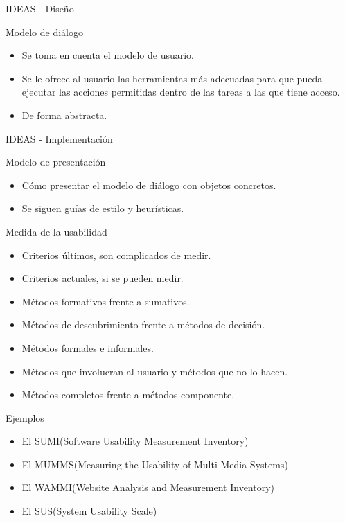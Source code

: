 \documentclass{beamer}
\begin{document}
\begin{frame}{IDEAS - Diseño}
  \begin{block}{Modelo de diálogo}
   \begin{itemize}
    \item Se toma en cuenta el modelo de usuario.
    \item Se le ofrece al usuario las herramientas más adecuadas para que pueda ejecutar las acciones permitidas dentro de las tareas a las
    que tiene acceso.
    \item De forma abstracta.
   \end{itemize}
  \end{block}
\end{frame}

\begin{frame}{IDEAS - Implementación}
 \begin{block}{Modelo de presentación}
  \begin{itemize}
   \item Cómo presentar el modelo de diálogo con objetos concretos.
   \item Se siguen guías de estilo y heurísticas.
  \end{itemize}
 \end{block}
\end{frame}

\begin{frame}{Medida de la usabilidad}
 \begin{itemize}
  \item Criterios últimos, son complicados de medir.
  \item Criterios actuales, si se pueden medir.
  \item Métodos formativos frente a sumativos.
  \item Métodos de descubrimiento frente a métodos de decisión.
  \item Métodos formales e informales.
  \item Métodos que involucran al usuario y métodos que no lo hacen.
  \item Métodos completos frente a métodos componente.
 \end{itemize}
\end{frame}

\begin{frame}{Ejemplos}
 \begin{itemize}
  \item El SUMI(Software Usability Measurement Inventory)
  \item El MUMMS(Measuring the Usability of Multi-Media Systems)
  \item El WAMMI(Website Analysis and Measurement Inventory)
  \item El SUS(System Usability Scale)
 \end{itemize}
\end{frame}
\end{document}

